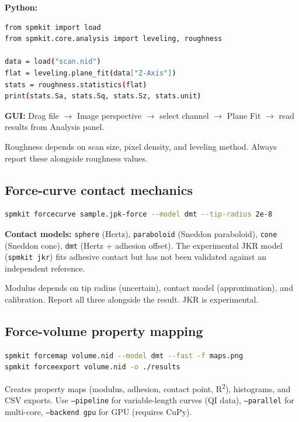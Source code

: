 \documentclass[a4paper,11pt]{article}
\begin{document}
\textbf{Python:}
\begin{lstlisting}[language=bash]
from spmkit import load
from spmkit.core.analysis import leveling, roughness

data = load("scan.nid")
flat = leveling.plane_fit(data["Z-Axis"])
stats = roughness.statistics(flat)
print(stats.Sa, stats.Sq, stats.Sz, stats.unit)
\end{lstlisting}

\textbf{GUI:} Drag file $\rightarrow$ Image perspective $\rightarrow$ select channel $\rightarrow$ Plane Fit $\rightarrow$ read results from Analysis panel.

\begin{warnbox}[Caveats]
Roughness depends on scan size, pixel density, and leveling method. Always report these
alongside roughness values.
\end{warnbox}

\subsection{Force-curve contact mechanics}

\begin{lstlisting}[language=bash]
spmkit forcecurve sample.jpk-force --model dmt --tip-radius 2e-8
\end{lstlisting}

\textbf{Contact models:} \texttt{sphere} (Hertz), \texttt{paraboloid} (Sneddon paraboloid),
\texttt{cone} (Sneddon cone), \texttt{dmt} (Hertz + adhesion offset). The experimental JKR
model (\texttt{spmkit jkr}) fits adhesive contact but has not been validated against an
independent reference.

\begin{warnbox}[Caveats]
Modulus depends on tip radius (uncertain), contact model (approximation), and calibration.
Report all three alongside the result. JKR is experimental.
\end{warnbox}

\subsection{Force-volume property mapping}

\begin{lstlisting}[language=bash]
spmkit forcemap volume.nid --model dmt --fast -f maps.png
spmkit forceexport volume.nid -o ./results
\end{lstlisting}

Creates property maps (modulus, adhesion, contact point, R\textsuperscript{2}), histograms, and CSV exports.
Use \texttt{--pipeline} for variable-length curves (QI data),
\texttt{--parallel} for multi-core, \texttt{--backend gpu} for GPU (requires CuPy).
\end{document}
